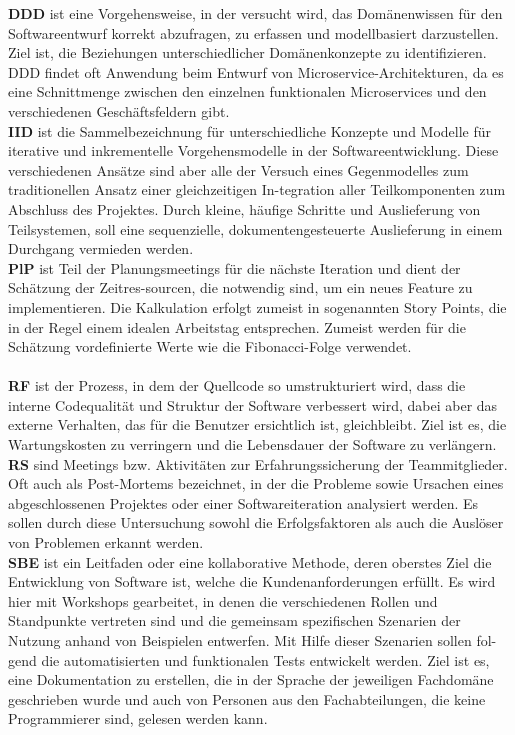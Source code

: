 \textbf{DDD} ist eine Vorgehensweise, in der versucht wird, das Domänenwissen für den Softwareentwurf korrekt abzufragen,
zu erfassen und modellbasiert darzustellen. Ziel ist, die Beziehungen unterschiedlicher Domänenkonzepte zu identifizieren.
DDD findet oft Anwendung beim Entwurf von Microservice-Architekturen,
da es eine Schnittmenge zwischen den einzelnen funktionalen Microservices und den verschiedenen Geschäftsfeldern gibt. \cite{Rademacher2018-yo} \\

\textbf{IID} ist die Sammelbezeichnung für unterschiedliche Konzepte und Modelle für iterative und inkrementelle Vorgehensmodelle
in der Softwareentwicklung. Diese verschiedenen Ansätze sind aber alle der Versuch eines Gegenmodelles zum traditionellen Ansatz einer
gleichzeitigen In-tegration aller Teilkomponenten zum Abschluss des Projektes.
Durch kleine, häufige Schritte und Auslieferung von Teilsystemen, soll eine sequenzielle,
dokumentengesteuerte Auslieferung in einem Durchgang vermieden werden. \cite{Larman2003-fg} \\

\textbf{PlP}  ist Teil der Planungsmeetings für die nächste Iteration und dient der Schätzung der Zeitres-sourcen,
die notwendig sind, um ein neues Feature zu implementieren.
Die Kalkulation erfolgt zumeist in sogenannten Story Points, die in der Regel einem idealen Arbeitstag entsprechen. 
Zumeist werden für die Schätzung vordefinierte Werte wie die Fibonacci-Folge verwendet. \\
\cite{Mahnic2012-ve} \\

\textbf{RF} ist der Prozess, in dem der Quellcode so umstrukturiert wird, dass die interne Codequalität und Struktur
der Software verbessert wird, dabei aber das externe Verhalten, das für die Benutzer ersichtlich ist, gleichbleibt.
Ziel ist es, die Wartungskosten zu verringern und die Lebensdauer der Software zu verlängern. \cite{Kaur2019-wy} \\

\textbf{RS} sind Meetings bzw. Aktivitäten zur Erfahrungssicherung der Teammitglieder. 
Oft auch als Post-Mortems bezeichnet, in der die Probleme sowie Ursachen eines abgeschlossenen Projektes oder einer Softwareiteration analysiert werden. 
Es sollen durch diese Untersuchung sowohl die Erfolgsfaktoren als auch die Auslöser von Problemen erkannt werden. \cite{Lehtinen2014-ou} \\

\textbf{SBE} ist ein Leitfaden oder eine kollaborative Methode, deren oberstes Ziel die Entwicklung von Software ist,
welche die Kundenanforderungen erfüllt. Es wird hier mit Workshops gearbeitet, in denen die verschiedenen Rollen und Standpunkte
vertreten sind und die gemeinsam spezifischen Szenarien der Nutzung anhand von Beispielen entwerfen.
Mit Hilfe dieser Szenarien sollen fol-gend die automatisierten und funktionalen Tests entwickelt werden. Ziel ist es, eine Dokumentation zu erstellen, 
die in der Sprache der jeweiligen Fachdomäne geschrieben wurde und auch von Personen aus den Fachabteilungen,
die keine Programmierer sind, gelesen werden kann. \cite{Blasquez2017-og,Bache2014-cp} \\

